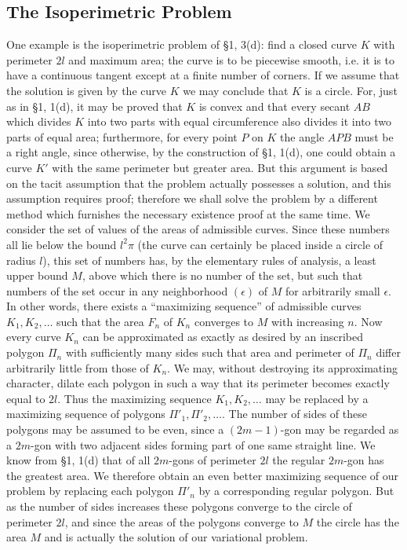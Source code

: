 \subsection{The Isoperimetric Problem}
One example is the isoperimetric problem of \S1, 3(d): find a closed curve $K$ with perimeter $2l$ and maximum area; the curve is to be piecewise smooth, i.e. it is to have a continuous tangent except at a finite number of corners. If we assume that the solution is given by the curve $K$ we may conclude that $K$ is a circle. For, just as in \S1, 1(d), it may be proved that $K$ is convex and that every secant $AB$ which divides $K$ into two parts with equal circumference also divides it into two parts of equal area; furthermore, for every point $P$ on $K$ the angle $APB$ must be a right angle, since otherwise, by the construction of \S1, 1(d), one could obtain a curve $K'$ with the same perimeter but greater area. But this argument is based on the tacit assumption that the problem actually possesses a solution, and this assumption requires proof; therefore we shall solve the problem by a different method which furnishes the necessary existence proof at the same time. We consider the set of values of the areas of admissible curves. Since these numbers all lie below the bound $l^2\pi$ (the curve can certainly be placed inside a circle of radius $l$), this set of numbers has, by the elementary rules of analysis, a least upper bound $M$, above which there is no number of the set, but such that numbers of the set occur in any neighborhood $(\epsilon)$ of $M$ for arbitrarily small $\epsilon$. In other words, there exists a ``maximizing sequence'' of admissible curves $K_1,K_2,\ldots$ such that the area $F_n$ of $K_n$ converges to $M$ with increasing $n$. Now every curve $K_n$ can be approximated as exactly as desired by an inscribed polygon $\Pi_n$ with sufficiently many sides such that area and perimeter of $\Pi_n$ differ arbitrarily little from those of $K_n$. We may, without destroying its approximating character, dilate each polygon in such a way that its perimeter becomes exactly equal to $2l$. Thus the maximizing sequence $K_1,K_2,\ldots$ may be replaced by a maximizing sequence of polygons $\Pi'_1,\Pi'_2,\ldots$. The number of sides of these polygons may be assumed to be even, since a $(2m-1)$-gon may be regarded as a $2m$-gon with two adjacent sides forming part of one same straight line. We know from \S1, 1(d) that of all $2m$-gons of perimeter $2l$ the regular $2m$-gon has the greatest area. We therefore obtain an even better maximizing sequence of our problem by replacing each polygon $\Pi'_n$ by a corresponding regular polygon. But as the number of sides increases these polygons converge to the circle of perimeter $2l$, and since the areas of the polygons converge to $M$ the circle has the area $M$ and is actually the solution of our variational problem.

